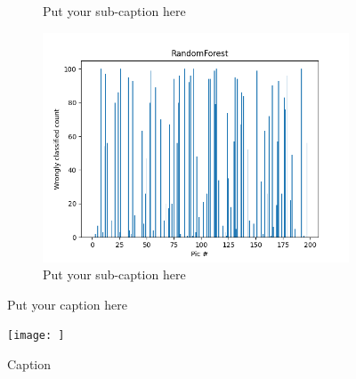 \documentclass{article}
\begin{document}
\begin{figure}[ht]
\begin{subfigure}{.33\textwidth}
  \caption{Put your sub-caption here}
  \label{fig:sub-second}
\end{subfigure}
\begin{subfigure}{.33\textwidth}
  \centering
  \includegraphics[width=1\linewidth]{1a/Random Forest.png}  
  \caption{Put your sub-caption here}
  \label{fig:sub-second}
\end{subfigure}
\caption{Put your caption here}
\label{fig:fig}
\end{figure}

\begin{figure}
    \centering
    \texttt{[image: ]}
    \caption{Caption}
    \label{fig:my_label}
\end{figure}
\end{document}
